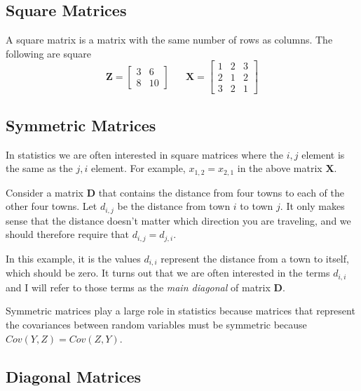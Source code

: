 \documentclass[]{book}
\theoremstyle{definition}
\theoremstyle{definition}
\theoremstyle{remark}
\begin{document}
\subsection{Square Matrices}\label{square-matrices}

A square matrix is a matrix with the same number of rows as columns. The
following are square \[
\boldsymbol{Z}=\left[\begin{array}{cc}
3 & 6\\
8 & 10
\end{array}\right]\;\;\;\;\;\;\boldsymbol{X}=\left[\begin{array}{ccc}
1 & 2 & 3\\
2 & 1 & 2\\
3 & 2 & 1
\end{array}\right]
\]

\subsection{Symmetric Matrices}\label{symmetric-matrices}

In statistics we are often interested in square matrices where the
\(i,j\) element is the same as the \(j,i\) element. For example,
\(x_{1,2}=x_{2,1}\) in the above matrix \(\boldsymbol{X}.\)

Consider a matrix \(\boldsymbol{D}\) that contains the distance from
four towns to each of the other four towns. Let \(d_{i,j}\) be the
distance from town \(i\) to town \(j\). It only makes sense that the
distance doesn't matter which direction you are traveling, and we should
therefore require that \(d_{i,j}=d_{j,i}\).

In this example, it is the values \(d_{i,i}\) represent the distance
from a town to itself, which should be zero. It turns out that we are
often interested in the terms \(d_{i,i}\) and I will refer to those
terms as the \emph{main diagonal} of matrix \(\boldsymbol{D}\).

Symmetric matrices play a large role in statistics because matrices that
represent the covariances between random variables must be symmetric
because \(Cov\left(Y,Z\right)=Cov\left(Z,Y\right)\).

\subsection{Diagonal Matrices}\label{diagonal-matrices}
\end{document}
